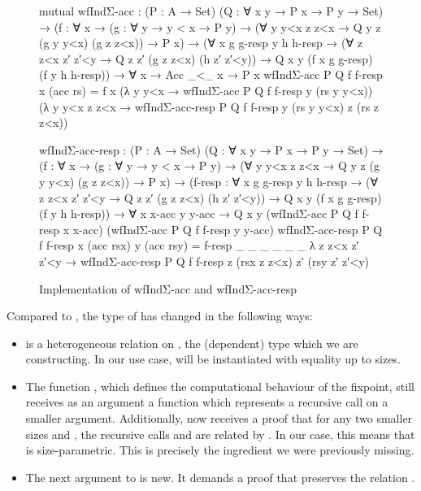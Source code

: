 \begin{figure}
  \centering
\begin{code}
mutual
  wfIndΣ-acc : (P : A → Set) (Q : ∀ x y → P x → P y → Set)
    → (f : ∀ x
        → (g : ∀ y → y < x → P y)
        → (∀ y y<x z z<x → Q y z (g y y<x) (g z z<x))
        → P x)
    → (∀ x g g-resp y h h-resp
        → (∀ z z<x z′ z′<y → Q z z′ (g z z<x) (h z′ z′<y))
        → Q x y (f x g g-resp) (f y h h-resp))
    → ∀ x → Acc _<_ x → P x
  wfIndΣ-acc P Q f f-resp x (acc rs)
    = f x
      (λ y y<x → wfIndΣ-acc P Q f f-resp y (rs y y<x))
      (λ y y<x z z<x
          → wfIndΣ-acc-resp P Q f f-resp y (rs y y<x) z (rs z z<x))

  wfIndΣ-acc-resp : (P : A → Set) (Q : ∀ x y → P x → P y → Set)
    → (f : ∀ x
        → (g : ∀ y → y < x → P y)
        → (∀ y y<x z z<x → Q y z (g y y<x) (g z z<x))
        → P x)
    → (f-resp : ∀ x g g-resp y h h-resp
        → (∀ z z<x z′ z′<y → Q z z′ (g z z<x) (h z′ z′<y))
        → Q x y (f x g g-resp) (f y h h-resp))
    → ∀ x x-acc y y-acc
    → Q x y
        (wfIndΣ-acc P Q f f-resp x x-acc)
        (wfIndΣ-acc P Q f f-resp y y-acc)
  wfIndΣ-acc-resp P Q f f-resp x (acc rsx) y (acc rsy)
    = f-resp _ _ _ _ _ _ λ z z<x z′ z′<y
        → wfIndΣ-acc-resp P Q f f-resp z (rsx z z<x) z′ (rsy z′ z′<y)
\end{code}

  \caption{Implementation of wfIndΣ-acc and wfIndΣ-acc-resp}
  \label{fig:wfIndΣ}
\end{figure}

Compared to , the type of  has changed in the
following ways:
\begin{itemize}
  \item {} is a heterogeneous relation on , the (dependent) type
    which we are constructing. In our use case,  will be instantiated
    with equality up to sizes.
  \item The function , which defines the computational behaviour of the
    fixpoint, still receives as an argument a function  which
    represents a recursive call on a smaller argument. Additionally, 
    now receives a proof that for any two smaller sizes  and ,
    the recursive calls  and  are related by . In
    our case, this means that  is size-parametric. This is precisely
    the ingredient we were previously missing.
  \item The next argument to  is new. It demands a proof that
     preserves the relation .
\end{itemize}


